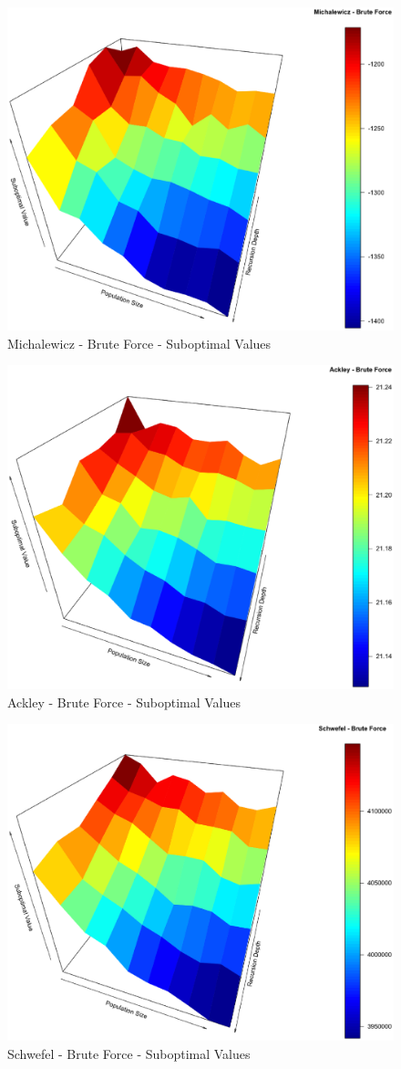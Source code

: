 \documentclass[conference]{IEEEtran}
\begin{document}
\begin{figure}[tbp]
\centering
\includegraphics[width=1.0\hsize,height=0.65\hsize]{fig18.eps}
\caption{Michalewicz - Brute Force - Suboptimal Values}
\label{fig06}
\end{figure}

\begin{figure}[tbp]
\centering
\includegraphics[width=1.0\hsize,height=0.65\hsize]{fig21.eps}
\caption{Ackley - Brute Force - Suboptimal Values}
\label{fig07}
\end{figure}

\begin{figure}[tbp]
\centering
\includegraphics[width=1.0\hsize,height=0.65\hsize]{fig24.eps}
\caption{Schwefel - Brute Force - Suboptimal Values}
\label{fig08}
\end{figure}
\end{document}
